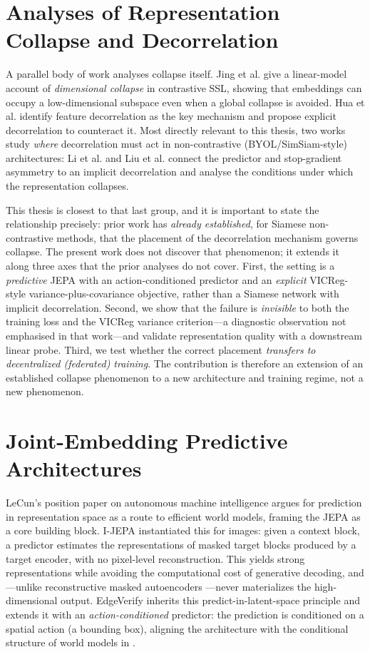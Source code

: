 \section{Analyses of Representation Collapse and Decorrelation}
\label{sec:collapse-lit}
A parallel body of work analyses collapse itself. Jing et al.
\cite{jing2022understanding} give a linear-model account of
\emph{dimensional collapse} in contrastive SSL, showing that embeddings can
occupy a low-dimensional subspace even when a global collapse is avoided.
Hua et al. \cite{hua2021feature} identify feature decorrelation as the key
mechanism and propose explicit decorrelation to counteract it. Most directly
relevant to this thesis, two works study \emph{where} decorrelation must act
in non-contrastive (BYOL/SimSiam-style) architectures: Li et al.
\cite{li2022understanding} and Liu et al. \cite{liu2022bridging} connect the
predictor and stop-gradient asymmetry to an implicit decorrelation and
analyse the conditions under which the representation collapses.

This thesis is closest to that last group, and it is important to state the
relationship precisely: prior work has \emph{already established}, for
Siamese non-contrastive methods, that the placement of the decorrelation
mechanism governs collapse. The present work does not discover that
phenomenon; it extends it along three axes that the prior analyses do not
cover. First, the setting is a \emph{predictive} JEPA with an
action-conditioned predictor and an \emph{explicit} VICReg-style
variance-plus-covariance objective, rather than a Siamese network with
implicit decorrelation. Second, we show that the failure is \emph{invisible}
to both the training loss and the VICReg variance criterion---a diagnostic
observation not emphasised in that work---and validate representation quality
with a downstream linear probe. Third, we test whether the correct placement
\emph{transfers to decentralized (federated) training}. The contribution is
therefore an extension of an established collapse phenomenon to a new
architecture and training regime, not a new phenomenon.

\section{Joint-Embedding Predictive Architectures}
LeCun's position paper on autonomous machine intelligence
\cite{lecun2022path} argues for prediction in representation space as a
route to efficient world models, framing the JEPA as a core building
block. I-JEPA \cite{assran2023self} instantiated this for images:
given a context block, a predictor estimates the representations of
masked target blocks produced by a target encoder, with no pixel-level
reconstruction. This yields strong representations while avoiding the
computational cost of generative decoding, and---unlike reconstructive
masked autoencoders \cite{he2022masked}---never materializes the
high-dimensional output. EdgeVerify inherits this predict-in-latent-space
principle and extends it with an \emph{action-conditioned} predictor:
the prediction is conditioned on a spatial action (a bounding box),
aligning the architecture with the conditional structure of world models
in \cite{lecun2022path}.

